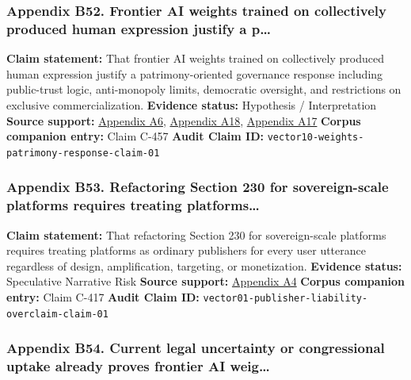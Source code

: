 \documentclass[
  american,
  11pt,
  letterpaper,
]{article}
\begin{document}
\subsubsection{Appendix B52. Frontier AI weights trained on collectively
produced human expression justify a
p\ldots{}}\label{ch-10-appendix-b52-frontier-ai-weights-trained-on-collectively-produced-human-expression-justify-a-p}

\textbf{Claim statement:} That frontier AI weights trained on
collectively produced human expression justify a patrimony-oriented
governance response including public-trust logic, anti-monopoly limits,
democratic oversight, and restrictions on exclusive commercialization.
\textbf{Evidence status:} Hypothesis / Interpretation \textbf{Source
support:}
\hyperref[ch-10-appendix-a6-copyright-and-artificial-intelligence-part-3-generative-ai-training-pre-publication-version]{Appendix
A6},
\hyperref[ch-10-appendix-a18-bipartisan-house-task-force-report-on-artificial-intelligence]{Appendix
A18},
\hyperref[ch-10-appendix-a17-ai-copyright-weights-a-new-frontier-in-intellectual-property-law]{Appendix
A17} \textbf{Corpus companion entry:} Claim C-457 \textbf{Audit Claim
ID:} \texttt{vector10-weights-patrimony-response-claim-01}

\subsubsection{Appendix B53. Refactoring Section 230 for sovereign-scale
platforms requires treating
platforms\ldots{}}\label{ch-10-appendix-b53-refactoring-section-230-for-sovereign-scale-platforms-requires-treating-platforms}

\textbf{Claim statement:} That refactoring Section 230 for
sovereign-scale platforms requires treating platforms as ordinary
publishers for every user utterance regardless of design, amplification,
targeting, or monetization. \textbf{Evidence status:} Speculative
Narrative Risk \textbf{Source support:}
\hyperref[ch-10-appendix-a4-a-look-behind-the-screens-examining-the-data-practices-of-social-media-and-video-streaming-services]{Appendix
A4} \textbf{Corpus companion entry:} Claim C-417 \textbf{Audit Claim
ID:} \texttt{vector01-publisher-liability-overclaim-claim-01}

\subsubsection{Appendix B54. Current legal uncertainty or congressional
uptake already proves frontier AI
weig\ldots{}}\label{ch-10-appendix-b54-current-legal-uncertainty-or-congressional-uptake-already-proves-frontier-ai-weig}
\end{document}
